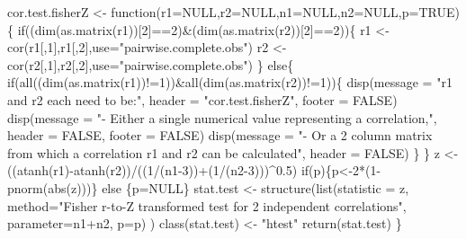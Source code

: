 \documentclass[]{article}
\newenvironment{Shaded}{\begin{snugshade}}{\end{snugshade}}
\newcommand{\KeywordTok}[1]{\textcolor[rgb]{0.94,0.87,0.69}{{#1}}}
\newcommand{\DataTypeTok}[1]{\textcolor[rgb]{0.87,0.87,0.75}{{#1}}}
\newcommand{\DecValTok}[1]{\textcolor[rgb]{0.86,0.86,0.80}{{#1}}}
\newcommand{\FloatTok}[1]{\textcolor[rgb]{0.75,0.75,0.82}{{#1}}}
\newcommand{\StringTok}[1]{\textcolor[rgb]{0.80,0.58,0.58}{{#1}}}
\newcommand{\OtherTok}[1]{\textcolor[rgb]{0.94,0.94,0.56}{{#1}}}
\newcommand{\NormalTok}[1]{\textcolor[rgb]{0.80,0.80,0.80}{{#1}}}
\begin{document}
\begin{Shaded}
\begin{Highlighting}[]
\NormalTok{cor.test.fisherZ <-}\StringTok{ }\NormalTok{function(}\DataTypeTok{r1=}\OtherTok{NULL}\NormalTok{,}\DataTypeTok{r2=}\OtherTok{NULL}\NormalTok{,}\DataTypeTok{n1=}\OtherTok{NULL}\NormalTok{,}\DataTypeTok{n2=}\OtherTok{NULL}\NormalTok{,}\DataTypeTok{p=}\OtherTok{TRUE}\NormalTok{)\{}
    \NormalTok{if((}\KeywordTok{dim}\NormalTok{(}\KeywordTok{as.matrix}\NormalTok{(r1))[}\DecValTok{2}\NormalTok{]==}\DecValTok{2}\NormalTok{)&(}\KeywordTok{dim}\NormalTok{(}\KeywordTok{as.matrix}\NormalTok{(r2))[}\DecValTok{2}\NormalTok{]==}\DecValTok{2}\NormalTok{))\{}
        \NormalTok{r1 <-}\StringTok{ }\KeywordTok{cor}\NormalTok{(r1[,}\DecValTok{1}\NormalTok{],r1[,}\DecValTok{2}\NormalTok{],}\DataTypeTok{use=}\StringTok{"pairwise.complete.obs"}\NormalTok{)}
        \NormalTok{r2 <-}\StringTok{ }\KeywordTok{cor}\NormalTok{(r2[,}\DecValTok{1}\NormalTok{],r2[,}\DecValTok{2}\NormalTok{],}\DataTypeTok{use=}\StringTok{"pairwise.complete.obs"}\NormalTok{)}
    \NormalTok{\} else\{}
        \NormalTok{if(}\KeywordTok{all}\NormalTok{((}\KeywordTok{dim}\NormalTok{(}\KeywordTok{as.matrix}\NormalTok{(r1))!=}\DecValTok{1}\NormalTok{))&}\KeywordTok{all}\NormalTok{(}\KeywordTok{dim}\NormalTok{(}\KeywordTok{as.matrix}\NormalTok{(r2))!=}\DecValTok{1}\NormalTok{))\{}
            \KeywordTok{disp}\NormalTok{(}\DataTypeTok{message =} \StringTok{"r1 and r2 each need to be:"}\NormalTok{, }\DataTypeTok{header =} \StringTok{"cor.test.fisherZ"}\NormalTok{, }\DataTypeTok{footer =} \OtherTok{FALSE}\NormalTok{)}
            \KeywordTok{disp}\NormalTok{(}\DataTypeTok{message =} \StringTok{"- Either a single numerical value representing a correlation,"}\NormalTok{, }\DataTypeTok{header =} \OtherTok{FALSE}\NormalTok{, }\DataTypeTok{footer =} \OtherTok{FALSE}\NormalTok{)}
            \KeywordTok{disp}\NormalTok{(}\DataTypeTok{message =} \StringTok{"- Or a 2 column matrix from which a correlation r1 and r2 can be calculated"}\NormalTok{, }\DataTypeTok{header =} \OtherTok{FALSE}\NormalTok{)}
        \NormalTok{\}}
    \NormalTok{\}}
    \NormalTok{z <-}\StringTok{ }\NormalTok{((}\KeywordTok{atanh}\NormalTok{(r1)-}\KeywordTok{atanh}\NormalTok{(r2))/((}\DecValTok{1}\NormalTok{/(n1}\DecValTok{-3}\NormalTok{))+(}\DecValTok{1}\NormalTok{/(n2}\DecValTok{-3}\NormalTok{)))^}\FloatTok{0.5}\NormalTok{)}
    \NormalTok{if(p)\{p<-}\DecValTok{2}\NormalTok{*(}\DecValTok{1}\NormalTok{-}\KeywordTok{pnorm}\NormalTok{(}\KeywordTok{abs}\NormalTok{(z)))\} else \{p=}\OtherTok{NULL}\NormalTok{\}}
    \NormalTok{stat.test <-}\StringTok{ }\KeywordTok{structure}\NormalTok{(}\KeywordTok{list}\NormalTok{(}\DataTypeTok{statistic =} \NormalTok{z,}
                                \DataTypeTok{method=}\StringTok{"Fisher r-to-Z transformed test for 2 independent correlations"}\NormalTok{,}
                                \DataTypeTok{parameter=}\NormalTok{n1+n2,}
                                \DataTypeTok{p=}\NormalTok{p)}
    \NormalTok{)}
    \KeywordTok{class}\NormalTok{(stat.test) <-}\StringTok{ "htest"}
    \KeywordTok{return}\NormalTok{(stat.test)}
\NormalTok{\}}
\end{Highlighting}
\end{Shaded}
\end{document}
